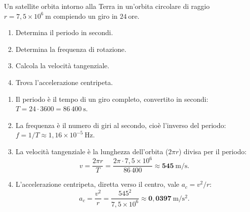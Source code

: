 \begin{question}[ID=1.1, subtitle={Satellite in orbita circolare con periodo di 24 ore}, tags={moto circolare, satellite}, difficulty=media]
Un satellite orbita intorno alla Terra in un'orbita circolare di raggio $r = 7{,}5\times10^6\ \mathrm{m}$ compiendo un giro in $24\ \mathrm{ore}$.
\begin{enumerate}
\item Determina il periodo in secondi.
\item Determina la frequenza di rotazione.
\item Calcola la velocità tangenziale.
\item Trova l'accelerazione centripeta.
\end{enumerate}
\begin{solution}
\begin{enumerate}
\item Il periodo è il tempo di un giro completo, convertito in secondi: $T = 24\cdot 3600 = 86\,400\ \mathrm{s}$.
\item La frequenza è il numero di giri al secondo, cioè l'inverso del periodo: $f = 1/T \approx 1{,}16\times10^{-5}\ \mathrm{Hz}$.
\item La velocità tangenziale è la lunghezza dell'orbita ($2\pi r$) divisa per il periodo:
\[
v = \frac{2\pi r}{T} = \frac{2\pi\cdot 7{,}5\times10^6}{86\,400} \approx \mathbf{545\ \mathrm{m/s}}.
\]
\item L'accelerazione centripeta, diretta verso il centro, vale $a_c = v^2/r$:
\[
a_c = \frac{v^2}{r} = \frac{545^2}{7{,}5\times10^6} \approx \mathbf{0{,}0397\ \mathrm{m/s^2}}.
\]
\end{enumerate}
\end{solution}
\end{question}


